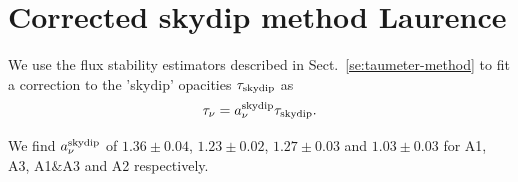 





\section{Corrected skydip method {\color{blue} Laurence}}
\label{se:corrected-skydip}

We use the flux stability estimators described in
Sect.~\ref{se:taumeter-method} to fit a correction to the 'skydip'
opacities $\tau_{\rm{skydip}}$ as
\begin{equation}  
  \tau_\nu =  a_\nu^{\rm{skydip}}\tau_{\rm{skydip}}.        
\end{equation}

We find $a_\nu^{\rm{skydip}}$ of
$1.36 \pm 0.04$,
$1.23 \pm 0.02$,
$1.27 \pm 0.03$ and
$1.03 \pm 0.03$ for A1, A3, A1$\&$A3 and A2 respectively.


